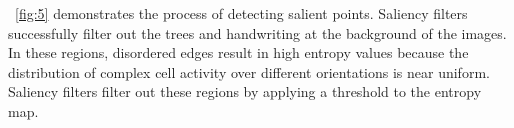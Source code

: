 \documentclass[twocolumn]{article}
\begin{document}
\figurename~\ref{fig:5} demonstrates the process of detecting salient points.
Saliency filters successfully filter out the trees and handwriting at the background of the images.
In these regions, disordered edges result in high entropy values because the distribution of complex cell activity over different orientations is near uniform.
Saliency filters filter out these regions by applying a threshold to the entropy map.

\begin{figure}[!t]
\centering
{}\hfil
{}\hfil
{}\\
\hfil
{}\hfil

\end{figure}
\end{document}

